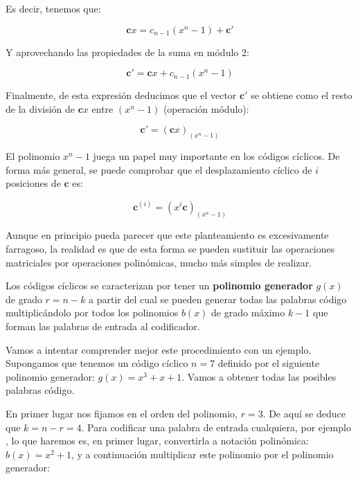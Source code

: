 \documentclass[es,apuntes]{uah}
\begin{document}
{Es decir, tenemos que:

\begin{displaymath}
	\mathbf{c} x = c_{n-1} (x^n - 1) + \mathbf{c'}
\end{displaymath}

Y aprovechando las propiedades de la suma en módulo 2:

\begin{displaymath}
	\mathbf{c'}= \mathbf{c} x + c_{n-1} (x^n - 1) 
\end{displaymath}

Finalmente, de esta expresión deducimos que el vector $\mathbf{c'}$ se obtiene como el resto de la división de $\mathbf{c} x$ entre $(x^n -1 )$ (operación módulo):

\begin{displaymath}
	\mathbf{c'} = \left ( \mathbf{c} x \right )_{(x^n - 1)}
\end{displaymath}


El polinomio $x^n -1 $ juega un papel muy importante en los códigos cíclicos. De forma más general, se puede comprobar que el desplazamiento cíclico de $i$ posiciones de $\mathbf{c}$ es:

\begin{displaymath}
	\mathbf{c}^{(i)} = (x^i \mathbf{c})_{(x^n -1)}
\end{displaymath}

Aunque en principio pueda parecer que este planteamiento es excesivamente farragoso, la realidad es que de esta forma se pueden sustituir las operaciones matriciales por operaciones polinómicas, mucho más simples de realizar. 

Los códigos cíclicos se caracterizan por tener un {\bf polinomio generador} $g(x)$ de grado $r = n-k$ a partir del cual se pueden generar todas las palabras código multiplicándolo por todos los polinomios $b(x)$ de grado máximo $k-1$ que forman las palabras de entrada al codificador. 

Vamos a intentar comprender mejor este procedimiento con un ejemplo. Supongamos que tenemos un código cíclico $n=7$ definido por el siguiente polinomio generador: $g(x) = x^3 + x + 1$. Vamos a obtener todas las posibles palabras código. 

En primer lugar nos fijamos en el orden del polinomio, $r= 3$. De aquí se deduce que $k = n-r = 4$. Para codificar una palabra de entrada cualquiera, por ejemplo , lo que haremos es, en primer lugar, convertirla a notación polinómica: $b(x) = x^2 + 1$, y a continuación multiplicar este polinomio por el polinomio generador:

}
\end{document}
